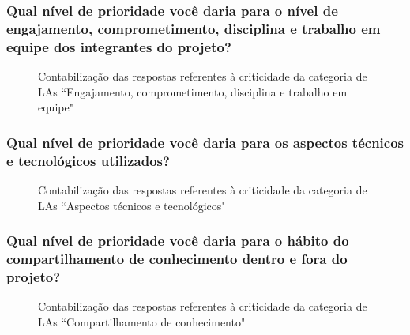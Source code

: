 \subsubsection{Qual nível de prioridade você daria para o nível de engajamento, comprometimento, disciplina e trabalho em equipe dos integrantes do projeto?}

\begin{figure}[H]
	\centering
	\captionsetup{justification=centering}
	\caption{Contabilização das respostas referentes à criticidade da categoria de LAs ``Engajamento, comprometimento, disciplina e trabalho em equipe"}
	\label{fig:result-engajamento}
\end{figure}

\subsubsection{Qual nível de prioridade você daria para os aspectos técnicos e tecnológicos utilizados?}

\begin{figure}[H]
	\centering
	\captionsetup{justification=centering}
	\caption{Contabilização das respostas referentes à criticidade da categoria de LAs ``Aspectos técnicos e tecnológicos"}
	\label{fig:result-tech}
\end{figure}

\subsubsection{Qual nível de prioridade você daria para o hábito do compartilhamento de conhecimento dentro e fora do projeto?}

\begin{figure}[H]
	\centering
	\captionsetup{justification=centering}
	\caption{Contabilização das respostas referentes à criticidade da categoria de LAs ``Compartilhamento de conhecimento"}
	\label{fig:result-conhecimento}
\end{figure}

